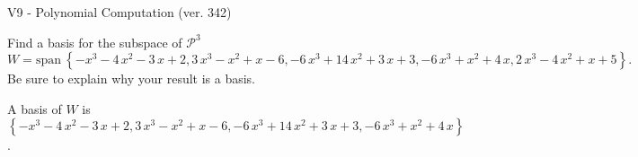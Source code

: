 \begin{exercise}
  \begin{exerciseTitle}V9 - Polynomial Computation (ver. 342)\end{exerciseTitle}
  \begin{exerciseStatement}
    Find a basis for the subspace of \(\mathcal{P}^3\) 
\[W=\mathrm{span}\ \left\{-x^{3} - 4 \, x^{2} - 3 \, x + 2 , 3 \, x^{3} - x^{2} + x - 6 , -6 \, x^{3} + 14 \, x^{2} + 3 \, x + 3 , -6 \, x^{3} + x^{2} + 4 \, x , 2 \, x^{3} - 4 \, x^{2} + x + 5\right\}.\]
 Be sure to explain why your result is a basis.


  \end{exerciseStatement}
  \begin{exerciseAnswer}
   A basis of \(W\) is  \(\left\{-x^{3} - 4 \, x^{2} - 3 \, x + 2 , 3 \, x^{3} - x^{2} + x - 6 , -6 \, x^{3} + 14 \, x^{2} + 3 \, x + 3 , -6 \, x^{3} + x^{2} + 4 \, x\right\}\).
  


  \end{exerciseAnswer}
\end{exercise}